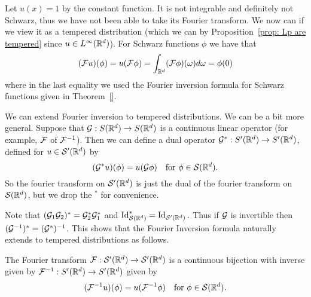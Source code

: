 \documentclass[twoside, a4paper, 10pt]{amsart}
\begin{document}
\begin{eg} Let $u(x) = 1$ by the constant function. It is not integrable and definitely not Schwarz, thus we have not been able to take its Fourier transform. We now can if we view it as a tempered distribution (which we can by Proposition~\ref{prop: Lp are tempered}  since $u \in L^{\infty}(\mathbb{R}^d)$). For Schwarz functions $\phi$ we have that $$(\mathcal{F} u)(\phi) = u(\mathcal{F} \phi) = \int_{\mathbb{R}^d} (\mathcal{F}\phi)(\omega) d\omega = \phi(0)$$ where in the last equality we used the Fourier inversion formula for Schwarz functions given in Theorem~\ref{}. 

\end{eg}

We can extend Fourier inversion to tempered distributions. We can be a bit more general. Suppose that $\mathcal{G}:S(\mathbb{R}^d) \to S(\mathbb{R}^d)$ is a continuous linear operator (for example, $\mathcal{F}$ of $\mathcal{F}^{-1}$). Then we can define a dual operator $\mathcal{G}^*:S'(\mathbb{R}^d) \to S'(\mathbb{R}^d)$, defined for $u \in \mathcal{S}'(\mathbb{R}^d)$ by $$(\mathcal{G}^* u)(\phi) = u(\mathcal{G} \phi) \quad\text{for } \phi \in \mathcal{S}(\mathbb{R}^d).$$  So the fourier transform on $\mathcal{S}'(\mathbb{R}^d)$ is just the dual of the fourier transform on $\mathcal{S}(\mathbb{R}^d)$, but we drop the $^*$ for convenience. 

Note that $(\mathcal{G}_1 \mathcal{G}_2)^* = \mathcal{G}_2^* \mathcal{G}_1^*$ and $\operatorname{Id}_{\mathcal{S}(\mathbb{R}^d)}^* = \operatorname{Id}_{\mathcal{S}'(\mathbb{R}^d)}.$ Thus if $\mathcal{G}$ is invertible then $(\mathcal{G}^{-1})^* = (\mathcal{G}^*)^{-1}$. This shows that the Fourier Inversion formula naturally extends to tempered distributions as follows.

\begin{thm} The Fourier transform $\mathcal{F}:\mathcal{S}'(\mathbb{R}^d) \to \mathcal{S}'(\mathbb{R}^d)$ is a continuous bijection with inverse given by $\mathcal{F}^{-1}:S'(\mathbb{R}^d) \to S'(\mathbb{R}^d)$ given by $$(\mathcal{F}^{-1} u)(\phi) = u(\mathcal{F}^{-1} \phi) \quad \text{for } \phi \in \mathcal{S}(\mathbb{R}^d).$$

\end{thm}
\end{document}
